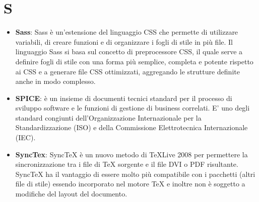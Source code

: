 \section{S}
\begin{itemize} 
	\item
	\textbf{Sass}: Sass è un'estensione del linguaggio CSS che permette di utilizzare variabili, di creare funzioni e di organizzare i fogli di stile in più file. Il linguaggio Sass si basa sul concetto di preprocessore CSS, il quale serve a definire fogli di stile con una forma più semplice, completa e potente rispetto ai CSS e a generare file CSS ottimizzati, aggregando le strutture definite anche in modo complesso.
	\item
	\textbf{SPICE}: è un insieme di documenti tecnici standard per il processo di sviluppo software e le funzioni di gestione di business correlati. E' uno degli standard congiunti dell'Organizzazione Internazionale per la Standardizzazione (ISO) e della Commissione Elettrotecnica Internazionale (IEC).
	\item
	\textbf{SyncTex}: SyncTeX è un nuovo metodo di TeXLive 2008 per permettere la sincronizzazione tra i file di TeX sorgente e il file DVI o PDF risultante. SyncTeX ha il vantaggio di essere molto più compatibile con i pacchetti (altri file di stile) essendo incorporato nel motore TeX e inoltre non è soggetto a modifiche del layout del documento.
	
\end{itemize}
